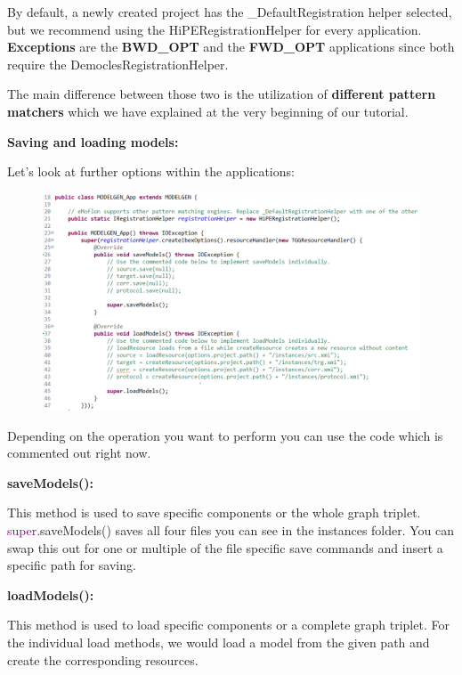 By default, a newly created project has the \textsf{\_DefaultRegistration} helper selected, but we recommend using the \textsf{HiPERegistrationHelper} for every application. \textbf{Exceptions} are the \textbf{BWD\_OPT} and the \textbf{FWD\_OPT} applications since both require the \textsf{DemoclesRegistrationHelper}.

The main difference between those two is the utilization of \textbf{different pattern matchers} which we have explained at the very beginning of our tutorial. 

\clearpage

\textbf{Saving and loading models:}

Let's look at further options within the applications:

\begin{figure}[h]
    \centering
    \includegraphics[scale=0.65 ]{pictures/application_MODELGEN.png}
    \caption{}
    \label{setDefaultNumber}
\end{figure}

Depending on the operation you want to perform you can use the code which is commented out right now.\newline

\textbf{saveModels():}

This method is used to save specific components or the whole graph triplet. \textcolor{Purple}{super}.saveModels() saves all four files you can see in the instances folder. You can swap this out for one or multiple of the file specific save commands and insert a specific path for saving.\newline

\textbf{loadModels():}

This method is used to load specific components or a complete graph triplet.
For the individual load methods, we would load a model from the given path and create the corresponding resources.\newline

